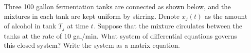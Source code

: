 \begin{problem}
    Three 100 gallon fermentation tanks are connected as shown below, and the mixtures in
    each tank are kept uniform by stirring.  Denote $x_j(t)$ as the amount of alcohol in
    tank $T_j$ at time $t$.  Suppose that the mixture circulates between the tanks at the
    rate of 10 gal/min.  What system of differential equations governs this closed system?
    Write the system as a matrix equation.
\end{problem}
\solution{
    \[ \frac{d\bx}{dt} = \frac{1}{10} \begin{pmatrix} -1 & 0 & 1 \\ 1 & -1 & 0 \\ 0 &
        1 & -1 \end{pmatrix} \bx \]
}
\begin{center}
\end{center}



